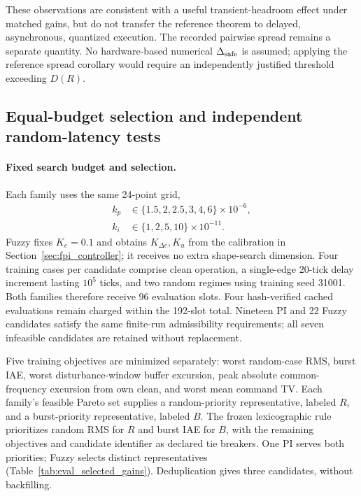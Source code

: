 These observations are consistent with a useful transient-headroom
effect under matched gains, but do not transfer the reference theorem
to delayed, asynchronous, quantized execution. The recorded pairwise
spread remains a separate quantity. No hardware-based numerical
$\Delta_{\rm safe}$ is assumed; applying the reference spread corollary
would require an independently justified threshold exceeding $D(R)$.

\subsection{Equal-budget selection and independent random-latency tests}
\label{subsec:eval_random}

\paragraph{Fixed search budget and selection.}
Each family uses the same 24-point grid,
\begin{align}
 k_p&\in\{1.5,2,2.5,3,4,6\}\times10^{-6},\nonumber\\
 k_i&\in\{1,2,5,10\}\times10^{-11}.
 \label{eq:eval_gain_grid}
\end{align}
Fuzzy fixes $K_e=0.1$ and obtains $K_{\Delta e},K_u$ from the
calibration in Section~\ref{sec:fpi_controller}; it receives no extra
shape-search dimension. Four training cases per candidate comprise
clean operation, a single-edge 20-tick delay increment lasting
$10^5$ ticks, and two random regimes using training seed 31001.
Both families therefore receive 96 evaluation slots. Four hash-verified
cached evaluations remain charged within the 192-slot total.
Nineteen PI and 22 Fuzzy candidates satisfy the same finite-run
admissibility requirements; all seven infeasible candidates are
retained without replacement.

Five training objectives are minimized separately: worst random-case
RMS, burst IAE, worst disturbance-window buffer excursion, peak absolute
common-frequency excursion from own clean, and worst mean command TV.
Each family's feasible Pareto set supplies a random-priority
representative, labeled $R$, and a burst-priority representative,
labeled $B$. The frozen lexicographic rule prioritizes random RMS for
$R$ and burst IAE for $B$, with the remaining objectives and candidate
identifier as declared tie breakers. One PI serves both priorities;
Fuzzy selects distinct representatives (Table~\ref{tab:eval_selected_gains}).
Deduplication gives three candidates, without backfilling.

